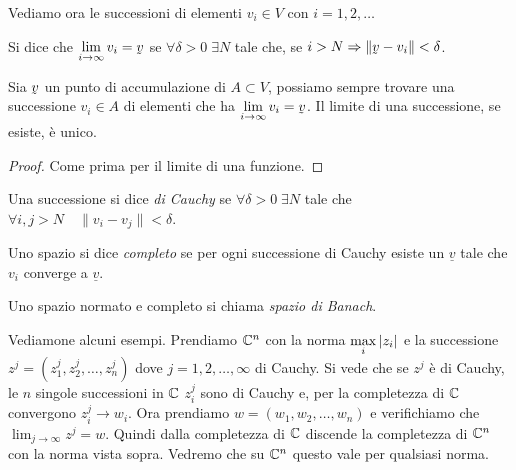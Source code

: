 Vediamo ora le successioni di elementi $v_i \in V$ con $i = 1,2, \ldots$
\begin{definition}
Si dice che $\displaystyle \lim_{i \to \infty} v_i = \underaccent{\tilde}{v}$
se $\forall \delta > 0 \; \exists N$ tale che, se $i > N \Rightarrow
\| \underaccent{\tilde}{v} - v_i\| < \delta$.
\end{definition}
\begin{theorem}
Sia $\underaccent{\tilde}{v}$ un punto di accumulazione di $A \subset V$,
possiamo sempre trovare una successione $v_i \in A$ di elementi che ha
$\displaystyle \lim_{i \to \infty} v_i = \underaccent{\tilde}{v}$.
Il limite di una successione, se esiste, è unico.
\end{theorem}
\begin{proof}
Come prima per il limite di una funzione.	
\end{proof}
\begin{definition}
Una successione si dice \emph{di Cauchy} se $\forall \delta > 0 \; \exists N$
tale che $\forall i, j > N \quad \|v_i - v_j\| < \delta$.
\end{definition}
\begin{definition}[completezza]
Uno spazio si dice \emph{completo} se per ogni successione di Cauchy esiste un
$\underline{v}$ tale che $v_i$ converge a $\underline{v}$.
\end{definition}
\begin{definition}
Uno spazio normato e completo si chiama \emph{spazio di Banach}.
\end{definition}

Vediamone alcuni esempi. Prendiamo $\mathbb C^n$ con la norma $\displaystyle \max_i
{\left|z_i\right|}$ e la successione $z^j =  \left(z_1^j, z_2^j, \ldots, z_n^j \right)$
dove $j = 1, 2, \ldots, \infty$ di Cauchy. Si vede che se $z^j$ è di Cauchy,
le $n$ singole successioni in $\mathbb C$ $z_i^j$ sono di Cauchy e, per la
completezza di $\mathbb C$ convergono $z_i^j \to w_i$.
Ora prendiamo $w = \left(w_1, w_2, \ldots, w_n \right)$ e verifichiamo che
$\displaystyle \lim_{j \to \infty} z^j = w$. Quindi dalla completezza di $\mathbb C$ 
discende la completezza di $\mathbb C^n$ con la norma vista sopra. Vedremo che su
$\mathbb C^n$ questo vale per qualsiasi norma.
